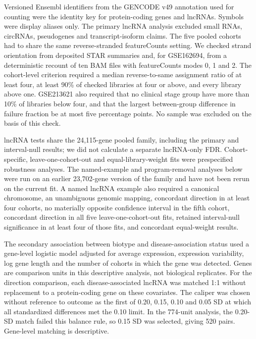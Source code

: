 Versioned Ensembl identifiers from the GENCODE v49 annotation used for counting were the identity key for protein-coding genes and lncRNAs. Symbols were display aliases only. The primary lncRNA analysis excluded small RNAs, circRNAs, pseudogenes and transcript-isoform claims. The five pooled cohorts had to share the same reverse-stranded featureCounts setting. We checked strand orientation from deposited STAR summaries and, for GSE162694, from a deterministic recount of ten BAM files with featureCounts modes 0, 1 and 2. The cohort-level criterion required a median reverse-to-same assignment ratio of at least four, at least 90\% of checked libraries at four or above, and every library above one. GSE213621 also required that no clinical stage group have more than 10\% of libraries below four, and that the largest between-group difference in failure fraction be at most five percentage points. No sample was excluded on the basis of this check.

lncRNA tests share the 24,115-gene pooled family, including the primary and interval-null results; we did not calculate a separate lncRNA-only FDR. Cohort-specific, leave-one-cohort-out and equal-library-weight fits were prespecified robustness analyses. The named-example and program-removal analyses below were run on an earlier 23,702-gene version of the family and have not been rerun on the current fit. A named lncRNA example also required a canonical chromosome, an unambiguous genomic mapping, concordant direction in at least four cohorts, no materially opposite confidence interval in the fifth cohort, concordant direction in all five leave-one-cohort-out fits, retained interval-null significance in at least four of those fits, and concordant equal-weight results.

The secondary association between biotype and disease-association status used a gene-level logistic model adjusted for average expression, expression variability, log gene length and the number of cohorts in which the gene was detected. Genes are comparison units in this descriptive analysis, not biological replicates. For the direction comparison, each disease-associated lncRNA was matched 1:1 without replacement to a protein-coding gene on these covariates. The caliper was chosen without reference to outcome as the first of 0.20, 0.15, 0.10 and 0.05 SD at which all standardized differences met the 0.10 limit. In the 774-unit analysis, the 0.20-SD match failed this balance rule, so 0.15 SD was selected, giving 520 pairs. Gene-level matching is descriptive.

